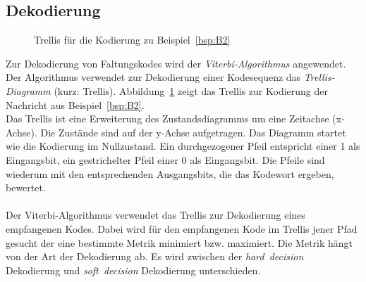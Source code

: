 \subsection{Dekodierung}
\label{kapitel:grundlagen_dekodierung}
\begin{figure}[t]
	\centering
		
\caption{Trellis für die Kodierung zu Beispiel~\ref{bsp:B2}}
\label{abb:trellis_kodierung}
\end{figure}
Zur Dekodierung von Faltungskodes wird der \emph{Viterbi-Algorithmus} angewendet. Der Algorithmus verwendet zur Dekodierung einer Kodesequenz das \emph{Trellis-Diagramm} (kurz: Trellis). Abbildung~\ref{abb:trellis_kodierung} zeigt das Trellis zur Kodierung der Nachricht aus Beispiel~\ref{bsp:B2}.
\\
Das Trellis ist eine Erweiterung des Zustandsdiagramms um eine Zeitachse (x-Achse). Die Zustände sind auf der y-Achse aufgetragen. Das Diagramm startet wie die Kodierung im Nullzustand. Ein durchgezogener Pfeil entspricht einer 1 als Eingangsbit, ein gestrichelter Pfeil einer 0 als Eingangsbit. Die Pfeile sind wiederum mit den entsprechenden Ausgangsbits, die das Kodewort ergeben, bewertet.
\\
\\
Der Viterbi-Algorithmus verwendet das Trellis zur Dekodierung eines empfangenen Kodes. Dabei wird für den empfangenen Kode im Trellis jener Pfad gesucht der eine bestimmte Metrik minimiert bzw. maximiert. Die Metrik hängt von der Art der Dekodierung ab. Es wird zwischen der \emph{hard~decision} Dekodierung und \emph{soft~decision} Dekodierung unterschieden.


